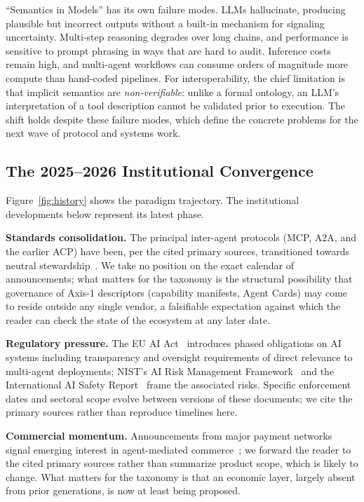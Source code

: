 \documentclass[10pt,twocolumn]{article}
\begin{document}
``Semantics in Models'' has its own failure modes. LLMs hallucinate, producing plausible but incorrect outputs without a built-in mechanism for signaling uncertainty. Multi-step reasoning degrades over long chains, and performance is sensitive to prompt phrasing in ways that are hard to audit. Inference costs remain high, and multi-agent workflows can consume orders of magnitude more compute than hand-coded pipelines. For interoperability, the chief limitation is that implicit semantics are \emph{non-verifiable}: unlike a formal ontology, an LLM's interpretation of a tool description cannot be validated prior to execution. The shift holds despite these failure modes, which define the concrete problems for the next wave of protocol and systems work.

\subsection{The 2025--2026 Institutional Convergence}\label{sec:convergence}

Figure~\ref{fig:history} shows the paradigm trajectory. The institutional developments below represent its latest phase.

\textbf{Standards consolidation.}  The principal inter-agent protocols (MCP, A2A, and the earlier ACP) have been, per the cited primary sources, transitioned towards neutral stewardship~\cite{AAIF_2025, A2A_LinuxFoundation_2025, ACP_Merger_2025}.  We take no position on the exact calendar of announcements; what matters for the taxonomy is the structural possibility that governance of Axis-1 descriptors (capability manifests, Agent Cards) may come to reside outside any single vendor, a falsifiable expectation against which the reader can check the state of the ecosystem at any later date.

\textbf{Regulatory pressure.}  The EU AI Act~\cite{EUAI_2024} introduces phased obligations on AI systems including transparency and oversight requirements of direct relevance to multi-agent deployments; NIST's AI Risk Management Framework~\cite{NIST_AI_600_2024} and the International AI Safety Report~\cite{AISAFETY_2025} frame the associated risks.  Specific enforcement dates and sectoral scope evolve between versions of these documents; we cite the primary sources rather than reproduce timelines here.

\textbf{Commercial momentum.}  Announcements from major payment networks signal emerging interest in agent-mediated commerce~\cite{Visa_TAP_2025, Mastercard_AgentPay_2025, Stripe_OpenAI_ACP_2025}; we forward the reader to the cited primary sources rather than summarize product scope, which is likely to change.  What matters for the taxonomy is that an economic layer, largely absent from prior generations, is now at least being proposed.
\end{document}
